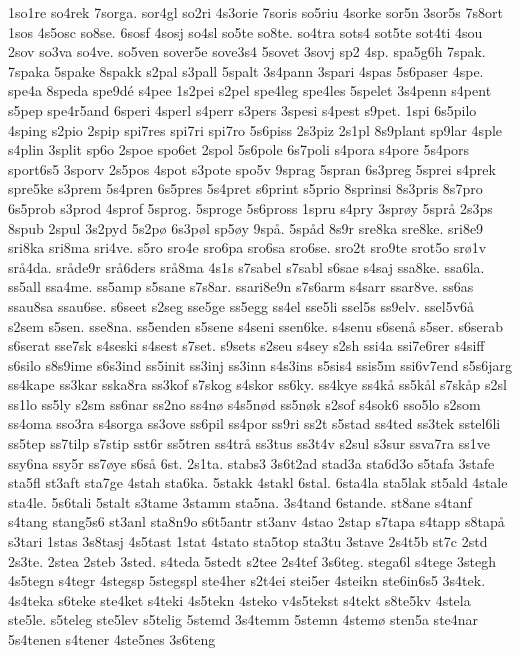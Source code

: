 {1so1re
so4rek
7sorga.
sor4gl
so2ri
4s3orie
7soris
so5riu
4sorke
sor5n
3sor5s
7s8ort
1sos
4s5osc
so8se.
6sosf
4sosj
so4sl
so5te
so8te.
so4tra
sots4
sot5te
sot4ti
4sou
2sov
so3va
so4ve.
so5ven
sover5e
sove3s4
5sovet
3sovj
sp2
4sp.
spa5g6h
7spak.
7spaka
5spake
8spakk
s2pal
s3pall
5spalt
3s4pann
3spari
4spas
5s6paser
4spe.
spe4a
8speda
spe9dé
s4pee
1s2pei
s2pel
spe4leg
spe4les
5spelet
3s4penn
s4pent
s5pep
spe4r5and
6speri
4sperl
s4perr
s3pers
3spesi
s4pest
s9pet.
1spi
6s5pilo
4sping
s2pio
2spip
spi7res
spi7ri
spi7ro
5s6piss
2s3piz
2s1pl
8s9plant
sp9lar
4sple
s4plin
3split
sp6o
2spoe
spo6et
2spol
5s6pole
6s7poli
s4pora
s4pore
5s4pors
sport6s5
3sporv
2s5pos
4spot
s3pote
spo5v
9sprag
5spran
6s3preg
5sprei
s4prek
spre5ke
s3prem
5s4pren
6s5pres
5s4pret
s6print
s5prio
8sprinsi
8s3pris
8s7pro
6s5prob
s3prod
4sprof
5sprog.
5sproge
5s6pross
1spru
s4pry
3sprøy
5språ
2s3ps
8spub
2spul
3s2pyd
5s2pø
6s3pøl
sp5øy
9spå.
5spåd
8s9r
sre8ka
sre8ke.
sri8e9
sri8ka
sri8ma
sri4ve.
s5ro
sro4e
sro6pa
sro6sa
sro6se.
sro2t
sro9te
srot5o
srø1v
srå4da.
sråde9r
srå6ders
srå8ma
4s1s
s7sabel
s7sabl
s6sae
s4saj
ssa8ke.
ssa6la.
ss5all
ssa4me.
ss5amp
s5sane
s7s8ar.
ssari8e9n
s7s6arm
s4sarr
ssar8ve.
ss6as
ssau8sa
ssau6se.
s6seet
s2seg
sse5ge
ss5egg
ss4el
sse5li
ssel5s
ss9elv.
ssel5v6å
s2sem
s5sen.
sse8na.
ss5enden
s5sene
s4seni
ssen6ke.
s4senu
s6senå
s5ser.
s6serab
s6serat
sse7sk
s4seski
s4sest
s7set.
s9sets
s2seu
s4sey
s2sh
ssi4a
ssi7e6rer
s4siff
s6silo
s8s9ime
s6s3ind
ss5init
ss3inj
ss3inn
s4s3ins
s5sis4
ssis5m
ssi6v7end
s5s6jarg
ss4kape
ss3kar
sska8ra
ss3kof
s7skog
s4skor
ss6ky.
ss4kye
ss4kå
ss5kål
s7skåp
s2sl
ss1lo
ss5ly
s2sm
ss6nar
ss2no
ss4nø
s4s5nød
ss5nøk
s2sof
s4sok6
sso5lo
s2som
ss4oma
sso3ra
s4sorga
ss3ove
ss6pil
ss4por
ss9ri
ss2t
s5stad
ss4ted
ss3tek
sstel6li
ss5tep
ss7tilp
s7stip
sst6r
ss5tren
ss4trå
ss3tus
ss3t4v
s2sul
s3sur
ssva7ra
ss1ve
ssy6na
ssy5r
ss7øye
s6så
6st.
2s1ta.
stabs3
3s6t2ad
stad3a
sta6d3o
s5tafa
3stafe
sta5fl
st3aft
sta7ge
4stah
sta6ka.
5stakk
4stakl
6stal.
6sta4la
sta5lak
st5ald
4stale
sta4le.
5s6tali
5stalt
s3tame
3stamm
sta5na.
3s4tand
6stande.
st8ane
s4tanf
s4tang
stang5s6
st3anl
sta8n9o
s6t5antr
st3anv
4stao
2stap
s7tapa
s4tapp
s8tapå
s3tari
1stas
3s8tasj
4s5tast
1stat
4stato
sta5top
sta3tu
3stave
2s4t5b
st7c
2std
2s3te.
2stea
2steb
3sted.
s4teda
5stedt
s2tee
2s4tef
3s6teg.
stega6l
s4tege
3stegh
4s5tegn
s4tegr
4stegsp
5stegspl
ste4her
s2t4ei
stei5er
4steikn
ste6in6s5
3s4tek.
4s4teka
s6teke
ste4ket
s4teki
4s5tekn
4steko
v4s5tekst
s4tekt
s8te5kv
4stela
ste5le.
s5teleg
ste5lev
s5telig
5stemd
3s4temm
5stemn
4stemø
sten5a
ste4nar
5s4tenen
s4tener
4ste5nes
3s6teng
}

